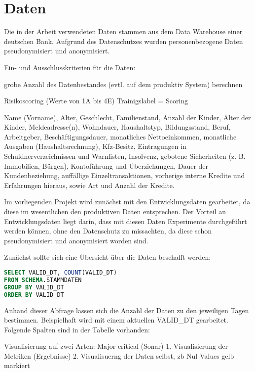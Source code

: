 \chapter{Daten}\label{ch:data}

Die in der Arbeit verwendeten Daten stammen aus dem Data Warehouse einer deutschen Bank.
Aufgrund des Datenschutzes wurden personenbezogene Daten pseudonymisiert und anonymisiert.

Ein- und Ausschlusskriterien für die Daten:



grobe Anzahl des Datenbestandes (evtl. auf dem produktiv System) berechnen


Risikoscoring (Werte von 1A bis 4E)
Trainigslabel = Scoring


 Name (Vorname), Alter, Geschlecht, Familienstand, Anzahl der Kinder,
Alter der Kinder, Meldeadresse(n), Wohndauer, Haushaltstyp, Bildungsstand, Beruf, Arbeitgeber, Beschäftigungsdauer, monatliches Nettoeinkommen, monatliche Ausgaben (Haushaltsrechnung), Kfz-Besitz, Eintragungen in Schuldnerverzeichnissen und Warnlisten, Insolvenz, gebotene Sicherheiten (z. B. Immobilien, Bürgen), Kontoführung und Überziehungen, Dauer der Kundenbeziehung, auffällige Einzeltransaktionen, vorherige interne
Kredite und Erfahrungen hieraus, sowie Art und Anzahl der Kredite. 





Im vorliegenden Projekt wird zunächst mit den Entwicklungsdaten gearbeitet, da diese im wesentlichen den produktiven Daten entsprechen.
Der Vorteil an Entwicklungsdaten liegt darin, dass mit diesen Daten Experimente durchgeführt werden können, ohne den Datenschutz zu missachten, da diese schon pseudonymisiert und anonymisiert worden sind. 

Zunächst sollte sich eine Übersicht über die Daten beschafft werden:


\begin{lstlisting}[language=SQL,caption={Überblick über die Daten},captionpos=b]
SELECT VALID_DT, COUNT(VALID_DT) 
FROM SCHEMA.STAMMDATEN 
GROUP BY VALID_DT 
ORDER BY VALID_DT
\end{lstlisting}
Anhand dieser Abfrage lassen sich die Anzahl der Daten zu den jeweiligen Tagen bestimmen. 
Beispielhaft wird mit einem aktuellen VALID_DT gearbeitet. 
Folgende Spalten sind in der Tabelle vorhanden:






Visualisierung auf zwei Arten: Major critical (Sonar)
1. Visualisierung der Metriken (Ergebnisse)
2. Visualisuerng der Daten selbst, zb Nul Values gelb markiert
